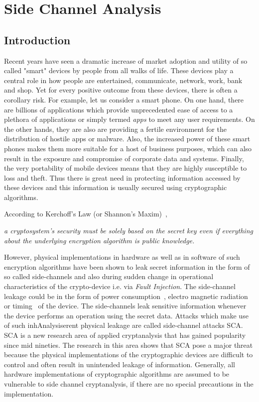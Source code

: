 \chapter{Side Channel Analysis}
\section{Introduction}%
Recent years have seen a dramatic increase of market adoption and utility of so called "smart" devices
by people from all walks of life. These devices play a central role in how people are entertained, communicate,
network, work, bank and shop. Yet for every positive outcome from these devices, there is often a corollary risk.
For example, let us consider a smart phone. On one hand, there are billions of applications which provide 
unprecedented ease of access to a plethora of applications or simply termed \emph{apps} to meet any user requirements. 
On the other hands, they are also are providing a fertile environment for the distribution of hostile apps or malware.
Also, the increased power of these smart phones makes them more suitable for a host of business purposes, which can also result
in the exposure and compromise of corporate data and systems. Finally, the very portability of mobile devices means that
they are highly susceptible to loss and theft. Thus there is great need in protecting information accessed by these devices
and this information is usually secured using cryptographic algorithms. 

According to Kerchoff's Law (or Shannon's Maxim)~\cite{klaws}, \newline
\parbox[c]{\textwidth}{\textit{a cryptosystem's security must be solely based on the 
		secret key even if everything about the underlying encryption algorithm is public knowledge.}} 
However, physical implementations in hardware as well as in software 
of such encryption algorithms have been shown to
leak secret information in the form of so called side-channels
and also during sudden change in operational characteristics of the crypto-device 
i.e. via \emph{Fault Injection}. The side-channel leakage could be in the 
form of power consumption~\cite{694}, electro magnetic radiation~\cite{811} or timing~\cite{694} 
of the device. The side-channels leak sensitive information whenever the device performs an 
operation using the secret data. Attacks which make use of such inhAnalysiserent physical leakage are called 
side-channel attacks \Gls{SCA}. \Gls{SCA} is a new research area of applied cryptanalysis that has
gained popularity since mid nineties. The research in this area shows that \Gls{SCA} pose a major 
threat because the physical implementations of the cryptographic
devices are difficult to control and often result in unintended leakage of information.
Generally, all hardware implementations of cryptographic algorithms are assumed to be vulnerable to side 
channel cryptanalysis, if there are no special precautions in the implementation.

